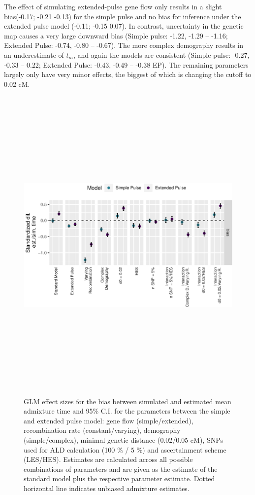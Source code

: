 \documentclass[11pt]{article}
\begin{document}
The effect of simulating extended-pulse gene flow only results in a slight bias(-0.17; -0.21 -0.13) for the simple pulse and no bias for inference under the extended pulse model (-0.11; -0.15  0.07). In contrast, uncertainty in the genetic map causes a very large downward bias (Simple pulse: -1.22, -1.29 -- -1.16; Extended Pulse: -0.74, -0.80 -- -0.67). The more complex demography results in an underestimate of $t_m$, and again the models are consistent (Simple pulse: -0.27, -0.33 -- 0.22; Extended Pulse: -0.43, -0.49 -- -0.38 EP). The remaining parameters largely only have very minor effects, the biggest of which is changing the cutoff to 0.02 cM. 


\begin{figure}
\centering
\includegraphics[width=12cm,height=16cm,keepaspectratio]{ATE_Revisions_files/figure-latex/figResult_3_GLM_SP_and_EP_bias-1.pdf}
\caption{\label{fig:figGLM} GLM effect sizes for the bias between simulated and estimated mean admixture time  and 95\% C.I. for the parameters between the simple and extended pulse model: gene flow (simple/extended), recombination rate (constant/varying), demography (simple/complex), minimal genetic distance (0.02/0.05 cM), SNPs used for ALD calculation (100 \% / 5 \%) and ascertainment scheme (LES/HES). Estimates are calculated across all possible combinations of parameters and are given as the estimate of the standard model plus the respective parameter estimate. Dotted horizontal line indicates unbiased admixture estimates.}
\end{figure}
\end{document}
